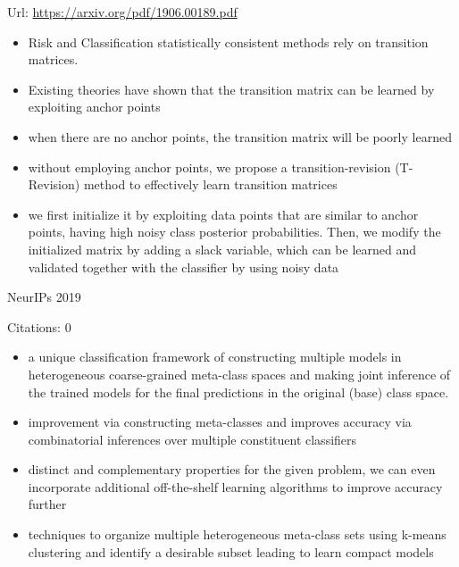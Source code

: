 \documentclass[11pt]{article}
\begin{document}
\noindent Url: \url{https://arxiv.org/pdf/1906.00189.pdf}

\begin{itemize}
   \item Risk and Classification statistically consistent methods rely on transition matrices. 
   \item Existing theories have shown that the transition matrix can be learned by exploiting anchor points
   \item when there are no anchor points, the transition matrix will be poorly learned
   \item without employing anchor points, we propose a transition-revision (T-Revision) method to effectively learn transition matrices
   \item we first initialize it by exploiting data points that are similar to anchor points, having high noisy class posterior probabilities. Then, we modify the initialized matrix by adding a slack variable, which can be learned and validated together with the classifier by using noisy data
\end{itemize}

\vspace{2cm}

\noindent NeurIPs 2019

\noindent Citations: 0

\begin{itemize}
  \item a unique classification framework of constructing multiple models in heterogeneous coarse-grained meta-class spaces and making joint inference of the trained models for the final predictions in the original (base) class space.
  \item improvement via constructing meta-classes and improves accuracy via combinatorial inferences over multiple constituent classifiers
  \item distinct and complementary properties for the given problem, we can even incorporate additional off-the-shelf learning algorithms to improve accuracy further
  \item techniques to organize multiple heterogeneous meta-class sets using k-means clustering and identify a desirable subset leading to learn compact models
\end{itemize}

\vspace{2cm}
\end{document}
